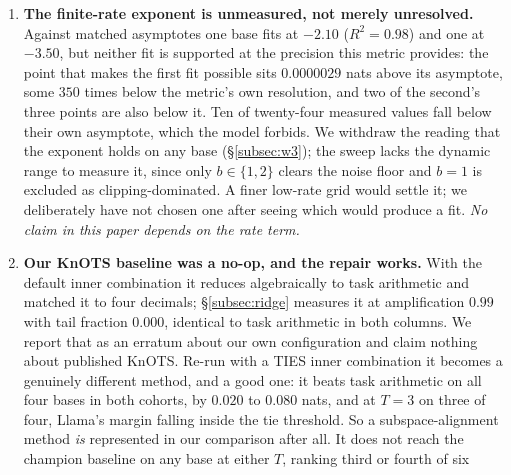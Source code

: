 \begin{enumerate}
  \textbf{The scope of this limitation is narrower than it was.} What fails
  above is the ranking of merge \emph{methods} within a cohort, where the
  differences are hundredths of a nat. The paper's own effect is not of that
  size, and \S\ref{subsec:downstream-cond} tests it directly: the
  conditioning collapse reaches GSM8K and HumanEval accuracy on four of four
  bases, and on Mistral the unregularised shared-cohort merge scores zero on
  both benchmarks with no scorer discards, recovering to $0.462$ and $0.244$
  with one ridge term. So a claim about method rankings in this unit should
  still not be read as a claim about accuracy. A claim about the
  conditioning regime may be, and that is the claim this paper makes.
\item \textbf{The finite-rate exponent is unmeasured, not merely
  unresolved.} Against matched asymptotes one base fits at $-2.10$
  ($R^2 = 0.98$) and one at $-3.50$, but neither fit is supported at the
  precision this metric provides: the point that makes the first fit
  possible sits $0.0000029$ nats above its asymptote, some $350$ times
  below the metric's own resolution, and two of the second's three points
  are also below it. Ten of twenty-four measured values fall below their
  own asymptote, which the model forbids. We withdraw the reading that the
  exponent holds on any base (\S\ref{subsec:w3}); the sweep lacks the
  dynamic range to measure it, since only $b \in \{1,2\}$ clears the noise
  floor and $b=1$ is excluded as clipping-dominated. A finer low-rate grid
  would settle it; we deliberately have not chosen one after seeing which
  would produce a fit. \emph{No claim in this paper depends on the rate
  term.}
\item \textbf{Our KnOTS baseline was a no-op, and the repair works.} With
  the default inner combination it reduces algebraically to task arithmetic
  and matched it to four decimals; \S\ref{subsec:ridge} measures it at
  amplification $0.99$ with tail fraction $0.000$, identical to task
  arithmetic in both columns. We report that as an erratum about our own
  configuration and claim nothing about published KnOTS. Re-run with a TIES
  inner combination it becomes a genuinely different method, and a good one:
  it beats task arithmetic on all four bases in both cohorts, by $0.020$ to
  $0.080$ nats, and at $T = 3$ on three of four, Llama's margin falling
  inside the tie threshold. So a subspace-alignment method \emph{is}
  represented in our comparison after all. It does not reach the champion
  baseline on any base at either $T$, ranking third or fourth of six

\end{enumerate}
